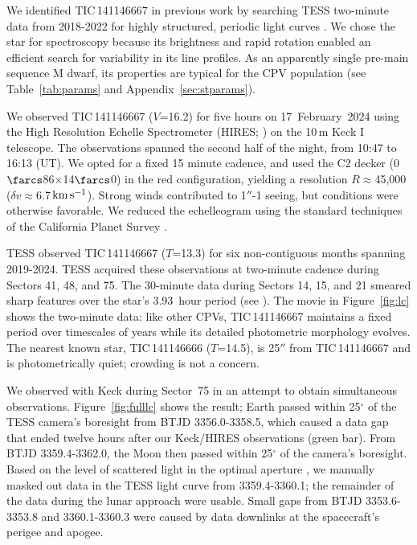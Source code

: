 \documentclass[11pt,twocolumn,tighten]{aastex7}
\newcommand{\kms}{\ensuremath{\rm km\,s^{-1}}}
\begin{document}
We identified TIC\,141146667 in previous work \citep{Bouma2024} by
searching TESS two-minute data from 2018-2022 for highly structured,
periodic light curves \citep{Ricker2015}.  We chose the star for
spectroscopy because its brightness and rapid rotation enabled an
efficient search for variability in its line profiles.  As an
apparently single pre-main sequence M dwarf, its properties are
typical for the CPV population (see Table~\ref{tab:params} and
Appendix~\ref{sec:stparams}).

We observed TIC\,141146667 ($V$=16.2) for five hours on
17~February~2024 using the High Resolution Echelle Spectrometer
(HIRES; \citealt{vogt_hires_1994}) on the 10\,m Keck I telescope.  The
observations spanned the second half of the night, from 10:47 to 16:13
(UT).  We opted for a fixed 15 minute cadence, and used the C2
decker (0$\farcs$86$\times$14$\farcs$0) in the red configuration,
yielding a resolution $R$$\approx$45{,}000 ($\delta
v$$\approx$6.7\,\kms).  Strong winds contributed to 1$''$-1
seeing, but conditions were otherwise favorable.  We reduced the
echelleogram using the standard techniques of the California Planet
Survey \citep{Howard2010}.  

TESS observed TIC\,141146667 ($T$=13.3) for six non-contiguous months
spanning 2019-2024.  TESS acquired these observations at two-minute
cadence during Sectors 41, 48, and 75.   The 30-minute data during
Sectors 14, 15, and 21 smeared sharp features over the star's
3.93~hour period (see \citealt{Gunther2022}).  The movie in
Figure~\ref{fig:lc} shows the two-minute data: like other CPVs,
TIC\,141146667 maintains a fixed period over timescales of years while
its detailed photometric morphology evolves.  The nearest known star,
TIC\,141146666 ($T$=14.5), is 25$''$ from TIC\,141146667 and is
photometrically quiet; crowding is not a concern.

We observed with Keck during Sector~75 in an attempt to obtain
simultaneous observations.   Figure~\ref{fig:fulllc} shows the result;
Earth passed within 25$^\circ$ of the TESS camera's boresight from
BTJD 3356.0-3358.5, which caused a data gap that ended twelve hours
after our Keck/HIRES observations (green bar).  From BTJD
3359.4-3362.0, the Moon then passed within 25$^\circ$ of the camera's
boresight.  Based on the level of scattered light in the optimal
aperture \citep{Jenkins2016}, we manually masked out data in the TESS
light curve from 3359.4-3360.1; the remainder of the data during the
lunar approach were usable.  Small gaps from BTJD 3353.6-3353.8 and
3360.1-3360.3 were caused by data downlinks at the spacecraft's
perigee and apogee.
\end{document}
